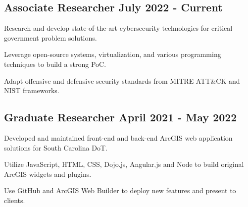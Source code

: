% 


\vspace*{12pt}
\subsection{{Associate Researcher }\hfill July 2022 - Current}
\begin{zitemize}
    \item Research and develop state-of-the-art cybersecurity technologies for critical government problem solutions.
    \item Leverage open-source systems, virtualization, and various programming techniques to build a strong PoC. 
    \item Adapt offensive and defensive security standards from MITRE ATT\&CK and NIST frameworks.
\end{zitemize}

\vspace*{15pt}
\subsection{{Graduate Researcher }\hfill April 2021 - May 2022}
\begin{zitemize}
    \item Developed and maintained front-end and back-end ArcGIS web application solutions for South Carolina DoT. 
    \item Utilize JavaScript, HTML, CSS, Dojo.js, Angular.js and Node to build original ArcGIS widgets and plugins.
    \item Use GitHub and ArcGIS Web Builder to deploy new features and present to clients. 
\end{zitemize}


